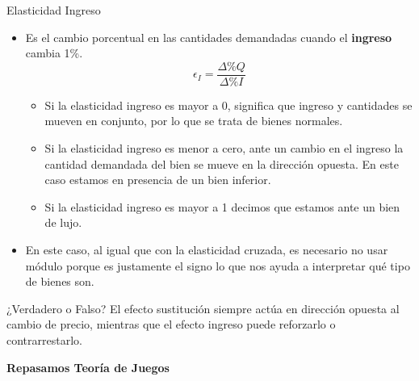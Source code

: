 \documentclass{beamer}
\begin{document}
\begin{frame}{Elasticidad Ingreso}
  \begin{itemize}
    \item Es el cambio porcentual en las cantidades demandadas cuando el \textbf{ingreso} cambia 1\%.
    \begin{equation*}
      \epsilon_I = \frac{\Delta \% Q}{\Delta \% I}
    \end{equation*}    
    \begin{itemize}
        \item Si la elasticidad ingreso es mayor a 0, significa que ingreso y cantidades se mueven en conjunto, por lo que se trata de bienes normales.
        \item Si la elasticidad ingreso es menor a cero, ante un cambio en el ingreso la cantidad demandada del bien se mueve en la dirección opuesta. En este caso estamos en presencia de un bien inferior.
        \item Si la elasticidad ingreso es mayor a 1 decimos que estamos ante un bien de lujo.
    \end{itemize}
    \item  En este caso, al igual que con la elasticidad cruzada, es necesario no usar módulo porque es justamente el signo lo que nos ayuda a interpretar qué tipo de bienes son.
\end{itemize}
\end{frame}

\begin{frame}{¿Verdadero o Falso?}
    \centering
    El efecto sustitución siempre actúa en dirección opuesta al cambio de precio, mientras que el efecto ingreso puede reforzarlo o contrarrestarlo.
\end{frame}

\begin{frame}
    \centering
    \begin{boxB}
    \centering \Large \textbf{Repasamos Teoría de Juegos} \\   
    \end{boxB}
\end{frame}
\end{document}
